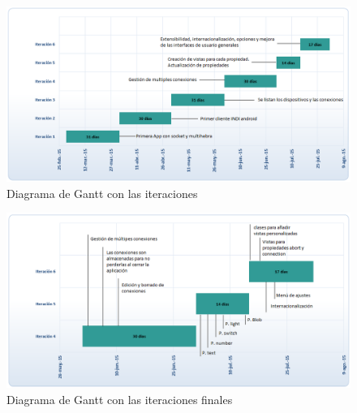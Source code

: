 \begin{figure}[!ht]
  \begin{center}
  \includegraphics[width=1\textwidth]{../images/iteraciones.png}
  \caption{Diagrama de Gantt con las iteraciones}
  \label{fig:iteraciones}
  \end{center}
\end{figure}


\begin{figure}[!ht]
  \begin{center}
  \includegraphics[width=1\textwidth]{../images/iteraciones_finales.png}
  \caption{Diagrama de Gantt con las iteraciones finales}
  \label{fig:iteraciones_finales}
  \end{center}
\end{figure}
